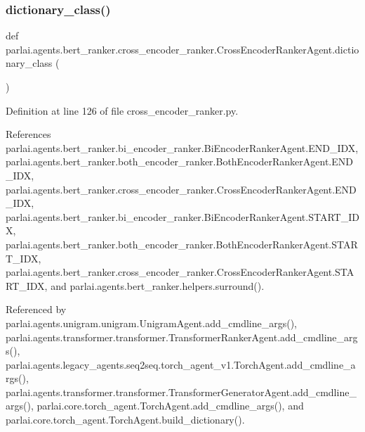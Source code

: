 \subsubsection{\texorpdfstring{dictionary\+\_\+class()}{dictionary\_class()}}
{\footnotesize\ttfamily def parlai.\+agents.\+bert\+\_\+ranker.\+cross\+\_\+encoder\+\_\+ranker.\+Cross\+Encoder\+Ranker\+Agent.\+dictionary\+\_\+class (\begin{DoxyParamCaption}{ }\end{DoxyParamCaption})\hspace{0.3cm}{\ttfamily [static]}}



Definition at line 126 of file cross\+\_\+encoder\+\_\+ranker.\+py.



References parlai.\+agents.\+bert\+\_\+ranker.\+bi\+\_\+encoder\+\_\+ranker.\+Bi\+Encoder\+Ranker\+Agent.\+E\+N\+D\+\_\+\+I\+DX, parlai.\+agents.\+bert\+\_\+ranker.\+both\+\_\+encoder\+\_\+ranker.\+Both\+Encoder\+Ranker\+Agent.\+E\+N\+D\+\_\+\+I\+DX, parlai.\+agents.\+bert\+\_\+ranker.\+cross\+\_\+encoder\+\_\+ranker.\+Cross\+Encoder\+Ranker\+Agent.\+E\+N\+D\+\_\+\+I\+DX, parlai.\+agents.\+bert\+\_\+ranker.\+bi\+\_\+encoder\+\_\+ranker.\+Bi\+Encoder\+Ranker\+Agent.\+S\+T\+A\+R\+T\+\_\+\+I\+DX, parlai.\+agents.\+bert\+\_\+ranker.\+both\+\_\+encoder\+\_\+ranker.\+Both\+Encoder\+Ranker\+Agent.\+S\+T\+A\+R\+T\+\_\+\+I\+DX, parlai.\+agents.\+bert\+\_\+ranker.\+cross\+\_\+encoder\+\_\+ranker.\+Cross\+Encoder\+Ranker\+Agent.\+S\+T\+A\+R\+T\+\_\+\+I\+DX, and parlai.\+agents.\+bert\+\_\+ranker.\+helpers.\+surround().



Referenced by parlai.\+agents.\+unigram.\+unigram.\+Unigram\+Agent.\+add\+\_\+cmdline\+\_\+args(), parlai.\+agents.\+transformer.\+transformer.\+Transformer\+Ranker\+Agent.\+add\+\_\+cmdline\+\_\+args(), parlai.\+agents.\+legacy\+\_\+agents.\+seq2seq.\+torch\+\_\+agent\+\_\+v1.\+Torch\+Agent.\+add\+\_\+cmdline\+\_\+args(), parlai.\+agents.\+transformer.\+transformer.\+Transformer\+Generator\+Agent.\+add\+\_\+cmdline\+\_\+args(), parlai.\+core.\+torch\+\_\+agent.\+Torch\+Agent.\+add\+\_\+cmdline\+\_\+args(), and parlai.\+core.\+torch\+\_\+agent.\+Torch\+Agent.\+build\+\_\+dictionary().

